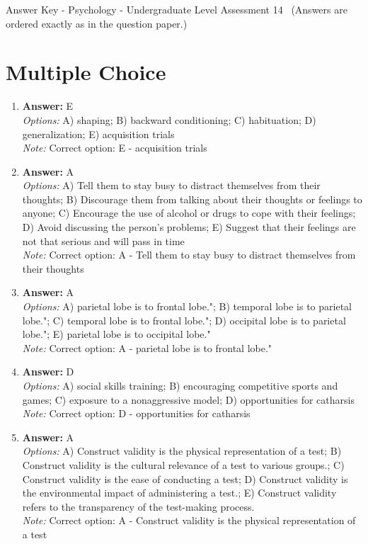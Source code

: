 \documentclass[12pt]{article}
\begin{document}
\begin{center}
Answer Key - Psychology - Undergraduate Level Assessment 14 \
\small (Answers are ordered exactly as in the question paper.)
\end{center}

\section*{Multiple Choice}
\begin{enumerate}[label=\arabic*.]
\item \textbf{Answer:} E
\\ \textit{Options:} A) shaping; B) backward conditioning; C) habituation; D) generalization; E) acquisition trials
\\ \textit{Note:} Correct option: E - acquisition trials
\item \textbf{Answer:} A
\\ \textit{Options:} A) Tell them to stay busy to distract themselves from their thoughts; B) Discourage them from talking about their thoughts or feelings to anyone; C) Encourage the use of alcohol or drugs to cope with their feelings; D) Avoid discussing the person's problems; E) Suggest that their feelings are not that serious and will pass in time
\\ \textit{Note:} Correct option: A - Tell them to stay busy to distract themselves from their thoughts
\item \textbf{Answer:} A
\\ \textit{Options:} A) parietal lobe is to frontal lobe."; B) temporal lobe is to parietal lobe."; C) temporal lobe is to frontal lobe."; D) occipital lobe is to parietal lobe."; E) parietal lobe is to occipital lobe."
\\ \textit{Note:} Correct option: A - parietal lobe is to frontal lobe."
\item \textbf{Answer:} D
\\ \textit{Options:} A) social skills training; B) encouraging competitive sports and games; C) exposure to a nonaggressive model; D) opportunities for catharsis
\\ \textit{Note:} Correct option: D - opportunities for catharsis
\item \textbf{Answer:} A
\\ \textit{Options:} A) Construct validity is the physical representation of a test; B) Construct validity is the cultural relevance of a test to various groups.; C) Construct validity is the ease of conducting a test; D) Construct validity is the environmental impact of administering a test.; E) Construct validity refers to the transparency of the test-making process.
\\ \textit{Note:} Correct option: A - Construct validity is the physical representation of a test
\end{enumerate}
\end{document}
